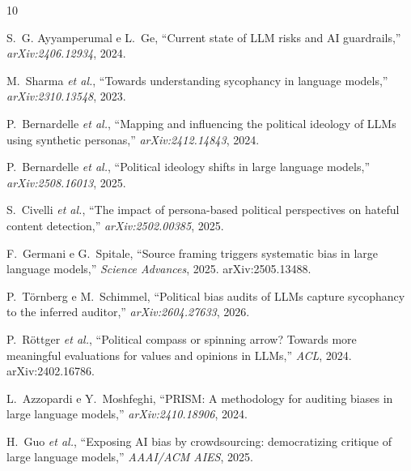 \documentclass[conference]{IEEEtran}
\begin{document}
\begin{thebibliography}{10}
\footnotesize

S.~G. Ayyamperumal e L.~Ge, ``Current state of LLM risks and AI guardrails,''
\textit{arXiv:2406.12934}, 2024.

M.~Sharma \textit{et al.}, ``Towards understanding sycophancy in language
models,'' \textit{arXiv:2310.13548}, 2023.

P.~Bernardelle \textit{et al.}, ``Mapping and influencing the political ideology
of LLMs using synthetic personas,'' \textit{arXiv:2412.14843}, 2024.

P.~Bernardelle \textit{et al.}, ``Political ideology shifts in large language
models,'' \textit{arXiv:2508.16013}, 2025.

S.~Civelli \textit{et al.}, ``The impact of persona-based political perspectives
on hateful content detection,'' \textit{arXiv:2502.00385}, 2025.

F.~Germani e G.~Spitale, ``Source framing triggers systematic bias in large
language models,'' \textit{Science Advances}, 2025. arXiv:2505.13488.

P.~Törnberg e M.~Schimmel, ``Political bias audits of LLMs capture sycophancy to
the inferred auditor,'' \textit{arXiv:2604.27633}, 2026.

P.~Röttger \textit{et al.}, ``Political compass or spinning arrow? Towards more
meaningful evaluations for values and opinions in LLMs,'' \textit{ACL}, 2024.
arXiv:2402.16786.

L.~Azzopardi e Y.~Moshfeghi, ``PRISM: A methodology for auditing biases in large
language models,'' \textit{arXiv:2410.18906}, 2024.

H.~Guo \textit{et al.}, ``Exposing AI bias by crowdsourcing: democratizing
critique of large language models,'' \textit{AAAI/ACM AIES}, 2025.

\end{thebibliography}
\end{document}
